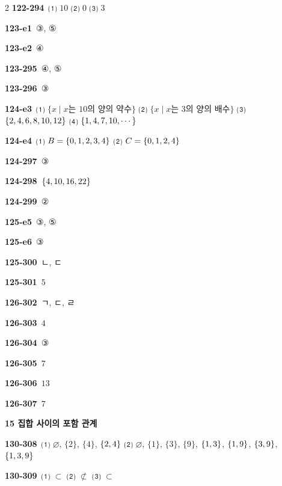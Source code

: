 \documentclass[10pt,a4paper]{article}
\begin{document}
\begin{multicols}{2}
\noindent\textbf{122-294}\ ⑴ $10$ ⑵ $0$ ⑶ $3$\par
\noindent\textbf{123-e1}\ ③, ⑤\par
\noindent\textbf{123-e2}\ ④\par
\noindent\textbf{123-295}\ ④, ⑤\par
\noindent\textbf{123-296}\ ③\par
\noindent\textbf{124-e3}\ ⑴ $\{x \mid x$는 $10$의 양의 약수$\}$ ⑵ $\{x \mid x$는 $3$의 양의 배수$\}$ ⑶ $\{2{,}\mkern3mu\mathopen{}4{,}\mkern3mu\mathopen{}6{,}\mkern3mu\mathopen{}8{,}\mkern3mu\mathopen{}10{,}\mkern3mu\mathopen{}12\}$ ⑷ $\{1{,}\mkern3mu\mathopen{}4{,}\mkern3mu\mathopen{}7{,}\mkern3mu\mathopen{}10{,}\mkern3mu\mathopen{}\cdots\}$\par
\noindent\textbf{124-e4}\ ⑴ $B=\{0{,}\mkern3mu\mathopen{}1{,}\mkern3mu\mathopen{}2{,}\mkern3mu\mathopen{}3{,}\mkern3mu\mathopen{}4\}$ ⑵ $C=\{0{,}\mkern3mu\mathopen{}1{,}\mkern3mu\mathopen{}2{,}\mkern3mu\mathopen{}4\}$\par
\noindent\textbf{124-297}\ ③\par
\noindent\textbf{124-298}\ $\{4{,}\mkern3mu\mathopen{}10{,}\mkern3mu\mathopen{}16{,}\mkern3mu\mathopen{}22\}$\par
\noindent\textbf{124-299}\ ②\par
\noindent\textbf{125-e5}\ ③, ⑤\par
\noindent\textbf{125-e6}\ ③\par
\noindent\textbf{125-300}\ ㄴ, ㄷ\par
\noindent\textbf{125-301}\ $5$\par
\noindent\textbf{126-302}\ ㄱ, ㄷ, ㄹ\par
\noindent\textbf{126-303}\ $4$\par
\noindent\textbf{126-304}\ ③\par
\noindent\textbf{126-305}\ $7$\par
\noindent\textbf{126-306}\ $13$\par
\noindent\textbf{126-307}\ $7$\par
\noindent\textbf{15 집합 사이의 포함 관계}\par\smallskip
\noindent\textbf{130-308}\ ⑴ $\varnothing$, $\{2\}$, $\{4\}$, $\{2{,}\mkern3mu\mathopen{}4\}$ ⑵ $\varnothing$, $\{1\}$, $\{3\}$, $\{9\}$, $\{1{,}\mkern3mu\mathopen{}3\}$, $\{1{,}\mkern3mu\mathopen{}9\}$, $\{3{,}\mkern3mu\mathopen{}9\}$, $\{1{,}\mkern3mu\mathopen{}3{,}\mkern3mu\mathopen{}9\}$\par
\noindent\textbf{130-309}\ ⑴ $\subset$ ⑵ $\not\subset$ ⑶ $\subset$\par

\end{multicols}
\end{document}
